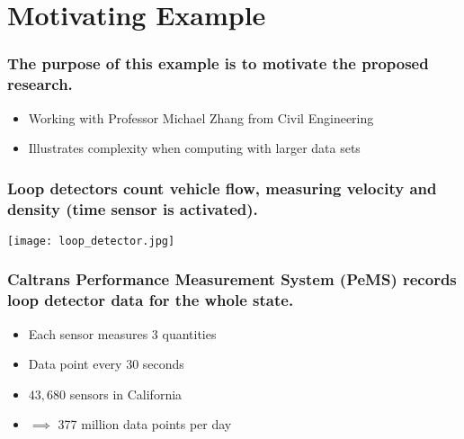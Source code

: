 \documentclass{beamer}
\begin{document}
\section{Motivating Example}
\begin{frame}

    \frametitle{The purpose of this example is to motivate the proposed
    research.}


    \begin{itemize}
        \item Working with Professor Michael Zhang from Civil Engineering
        \item Illustrates complexity when computing with larger data sets
    \end{itemize}

\end{frame}
\begin{frame}

    \frametitle{Loop detectors count vehicle flow, measuring velocity and
    density (time sensor is activated).}


\centerline{\texttt{[image: loop\_detector.jpg]}}

\end{frame}
\begin{frame}


\frametitle{Caltrans Performance Measurement System (PeMS) records loop
    detector data for the whole state.}

    \begin{itemize}
        \item Each sensor measures 3 quantities
        \item Data point every 30 seconds
        \item $43,680$ sensors in California
        \item $\implies$  377 million data points per day
    \end{itemize}

\end{frame}
\end{document}
